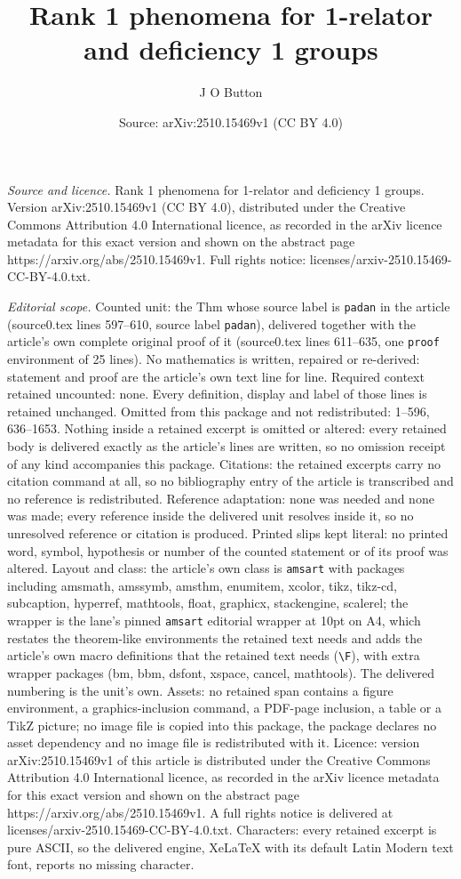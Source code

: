 \documentclass[10pt,a4paper]{amsart}
\title[Rank 1 phenomena for 1-relator and deficiency 1 groups]{Rank 1 phenomena for 1-relator and deficiency 1 groups}
\author{J O Button}
\date{Source: arXiv:2510.15469v1 (CC BY 4.0)}
\begin{document}
\maketitle

\noindent\emph{Source and licence.} Rank 1 phenomena for 1-relator and deficiency 1 groups. Version arXiv:2510.15469v1 (CC BY 4.0), distributed under the Creative Commons Attribution 4.0 International licence, as recorded in the arXiv licence metadata for this exact version and shown on the abstract page https://arxiv.org/abs/2510.15469v1. Full rights notice: licenses/arxiv-2510.15469-CC-BY-4.0.txt.\par\smallskip

\noindent\textit{Editorial scope.} Counted unit: the Thm whose source label is \texttt{padan} in the article (source0.tex lines 597--610, source label \texttt{padan}), delivered together with the article's own complete original proof of it (source0.tex lines 611--635, one \texttt{proof} environment of 25 lines). No mathematics is written, repaired or re-derived: statement and proof are the article's own text line for line. Required context retained uncounted: none. Every definition, display and label of those lines is retained unchanged. Omitted from this package and not redistributed: 1--596, 636--1653. Nothing inside a retained excerpt is omitted or altered: every retained body is delivered exactly as the article's lines are written, so no omission receipt of any kind accompanies this package. Citations: the retained excerpts carry no citation command at all, so no bibliography entry of the article is transcribed and no reference is redistributed. Reference adaptation: none was needed and none was made; every reference inside the delivered unit resolves inside it, so no unresolved reference or citation is produced. Printed slips kept literal: no printed word, symbol, hypothesis or number of the counted statement or of its proof was altered. Layout and class: the article's own class is \texttt{amsart} with packages including amsmath, amssymb, amsthm, enumitem, xcolor, tikz, tikz-cd, subcaption, hyperref, mathtools, float, graphicx, stackengine, scalerel; the wrapper is the lane's pinned \texttt{amsart} editorial wrapper at 10pt on A4, which restates the theorem-like environments the retained text needs and adds the article's own macro definitions that the retained text needs (\texttt{\textbackslash F}), with extra wrapper packages (bm, bbm, dsfont, xspace, cancel, mathtools). The delivered numbering is the unit's own. Assets: no retained span contains a figure environment, a graphics-inclusion command, a PDF-page inclusion, a table or a TikZ picture; no image file is copied into this package, the package declares no asset dependency and no image file is redistributed with it. Licence: version arXiv:2510.15469v1 of this article is distributed under the Creative Commons Attribution 4.0 International licence, as recorded in the arXiv licence metadata for this exact version and shown on the abstract page https://arxiv.org/abs/2510.15469v1. A full rights notice is delivered at licenses/arxiv-2510.15469-CC-BY-4.0.txt. Characters: every retained excerpt is pure ASCII, so the delivered engine, XeLaTeX with its default Latin Modern text font, reports no missing character.
\end{document}

